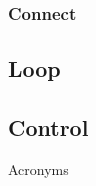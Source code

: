 \documentclass[aspectratio=169]{beamer}
\begin{document}
\subsubsection{Connect}

\subsection{Loop}

\subsection{Control}


\appendix

\begin{frame}[allowframebreaks]{Acronyms}
    \printglossary[type=\acronymtype, nonumberlist]
\end{frame}

%     
\end{document}

